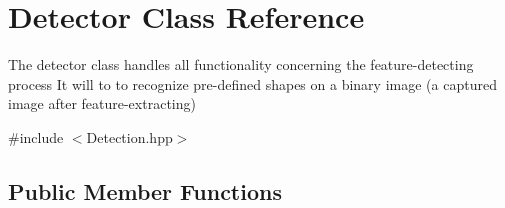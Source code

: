 \hypertarget{classDetector}{}\section{Detector Class Reference}
\label{classDetector}


The detector class handles all functionality concerning the feature-\/detecting process It will to to recognize pre-\/defined shapes on a binary image (a captured image after feature-\/extracting)  




{\ttfamily \#include $<$Detection.\+hpp$>$}

\subsection*{Public Member Functions}
